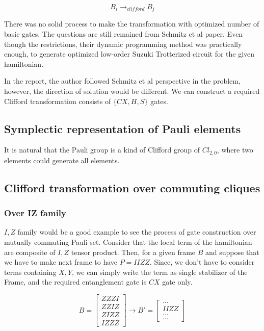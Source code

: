 \documentclass[a4paper,12pt]{article}
\begin{document}
\begin{equation*}
    B_i \rightarrow_{clifford} B_j
\end{equation*}

There was no solid process to make the transformation with optimized 
number of basic gates.
The questions are still remained from Schmitz et al paper.
Even though the restrictions, their dynamic programming method was practically enough, to generate
optimized low-order Suzuki Trotterized circuit for the given hamiltonian\cite{schmitz_graph_2023}.


In the report, the author followed Schmitz et al perspective in the problem,
however, the direction of solution would be different.
We can construct a required Clifford transformation consists of $\{CX, H, S\}$
gates.

\subsection{Symplectic representation of Pauli elements}

It is natural that the Pauli group is a kind of Clifford group of $Cl_{2,0}$,
where two elements could generate all elements.


\subsection{Clifford transformation over commuting cliques}

\subsubsection{Over IZ family}

$I, Z$ family would be a good example to see the process of gate construction
over mutually commuting Pauli set.
Consider that the local term of the hamiltonian are composite of $I, Z$ tensor product.
Then, for a given frame $B$ and suppose that we have to make next frame to have $P = IIZZ$.
Since, we don't have to consider terms containing $X, Y$, we can simply write the term 
as single stabilizer of the Frame, and the required entanglement gate is $CX$ gate only.

\begin{equation}
    B = \begin{bmatrix}
        ZZZI\\
        ZZIZ\\
        ZIZZ\\
        IZZZ
    \end{bmatrix}
    \rightarrow B' = \begin{bmatrix}
        \dots\\
        IIZZ\\
        \dots\\
        \dots
    \end{bmatrix}
\end{equation}
\end{document}
